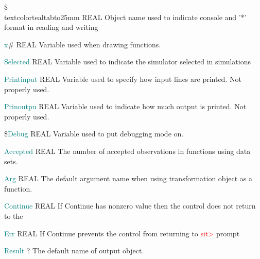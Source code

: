 \noindent \$ \\textcolor{teal}{tabto{25mm} }  REAL \tabto{45mm }   Object name used to indicate console and '*' format in reading and writing


\noindent \textcolor{teal}{x}\# \tabto{25mm }  REAL \tabto{45mm }   Variable used when drawing functions.

\noindent \textcolor{teal}{Selected} \tabto{25mm }   REAL  \tabto{45mm }  Variable used to indicate the simulator selected in simulations

\noindent \textcolor{teal}{Printinput} \tabto{25mm }   REAL \tabto{45mm }   Variable used to specify how input lines are printed. Not properly used.

\noindent \textcolor{teal}{Prinoutpu} \tabto{25mm }   REAL \tabto{45mm }   Variable used to indicate how much output is printed. Not properly used.






\noindent \$\textcolor{teal}{Debug} \tabto{25mm }  REAL \tabto{45mm }   Variable used to put debugging mode on.









\noindent \textcolor{teal}{Accepted}  \tabto{25mm }  REAL \tabto{45mm }   The number of accepted observations in functions using data sets.


\noindent \textcolor{teal}{Arg} \tabto{25mm }   REAL  \tabto{45mm }   The default argument name when using transformation object as a function.



\noindent \textcolor{teal}{Continue}  \tabto{25mm }  REAL \tabto{45mm }   If Continue has nonzero value then the control does not return to the



\noindent \textcolor{teal}{Err} \tabto{25mm }  REAL \tabto{45mm }   If Continue prevents the control from returning to \textcolor{Red}{sit>} prompt







\noindent \textcolor{teal}{Result} \tabto{25mm }   ?  \tabto{45mm }   The default name of output object.

